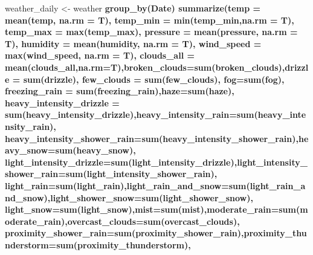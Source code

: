 \documentclass[]{article}
\newenvironment{Shaded}{\begin{snugshade}}{\end{snugshade}}
\newcommand{\KeywordTok}[1]{\textcolor[rgb]{0.13,0.29,0.53}{\textbf{#1}}}
\newcommand{\DataTypeTok}[1]{\textcolor[rgb]{0.13,0.29,0.53}{#1}}
\newcommand{\StringTok}[1]{\textcolor[rgb]{0.31,0.60,0.02}{#1}}
\newcommand{\OperatorTok}[1]{\textcolor[rgb]{0.81,0.36,0.00}{\textbf{#1}}}
\newcommand{\NormalTok}[1]{#1}
\begin{document}
\begin{Shaded}
\begin{Highlighting}[]
\NormalTok{weather_daily <-}\StringTok{ }\NormalTok{weather }\OperatorTok{%>%}\StringTok{ }
\StringTok{  }\KeywordTok{group_by}\NormalTok{(Date) }\OperatorTok{%>%}\StringTok{ }
\StringTok{  }\KeywordTok{summarize}\NormalTok{(}\DataTypeTok{temp =} \KeywordTok{mean}\NormalTok{(temp, }\DataTypeTok{na.rm =}\NormalTok{ T), }\DataTypeTok{temp_min =} \KeywordTok{min}\NormalTok{(temp_min,}\DataTypeTok{na.rm =}\NormalTok{ T), }\DataTypeTok{temp_max =} \KeywordTok{max}\NormalTok{(temp_max),}
            \DataTypeTok{pressure =} \KeywordTok{mean}\NormalTok{(pressure, }\DataTypeTok{na.rm =}\NormalTok{ T), }\DataTypeTok{humidity =} \KeywordTok{mean}\NormalTok{(humidity, }\DataTypeTok{na.rm =}\NormalTok{ T), }\DataTypeTok{wind_speed =} \KeywordTok{max}\NormalTok{(wind_speed, }\DataTypeTok{na.rm  =}\NormalTok{ T),}
            \DataTypeTok{clouds_all =} \KeywordTok{mean}\NormalTok{(clouds_all,}\DataTypeTok{na.rm=}\NormalTok{T),}\DataTypeTok{broken_clouds=}\KeywordTok{sum}\NormalTok{(broken_clouds),}\DataTypeTok{drizzle =} \KeywordTok{sum}\NormalTok{(drizzle),}
            \DataTypeTok{few_clouds =} \KeywordTok{sum}\NormalTok{(few_clouds), }\DataTypeTok{fog=}\KeywordTok{sum}\NormalTok{(fog), }\DataTypeTok{freezing_rain =} \KeywordTok{sum}\NormalTok{(freezing_rain),}\DataTypeTok{haze=}\KeywordTok{sum}\NormalTok{(haze),}
            \DataTypeTok{heavy_intensity_drizzle =} \KeywordTok{sum}\NormalTok{(heavy_intensity_drizzle),}\DataTypeTok{heavy_intensity_rain=}\KeywordTok{sum}\NormalTok{(heavy_intensity_rain),}
            \DataTypeTok{heavy_intensity_shower_rain=}\KeywordTok{sum}\NormalTok{(heavy_intensity_shower_rain),}\DataTypeTok{heavy_snow=}\KeywordTok{sum}\NormalTok{(heavy_snow),}
            \DataTypeTok{light_intensity_drizzle=}\KeywordTok{sum}\NormalTok{(light_intensity_drizzle),}\DataTypeTok{light_intensity_shower_rain=}\KeywordTok{sum}\NormalTok{(light_intensity_shower_rain),}
            \DataTypeTok{light_rain=}\KeywordTok{sum}\NormalTok{(light_rain),}\DataTypeTok{light_rain_and_snow=}\KeywordTok{sum}\NormalTok{(light_rain_and_snow),}\DataTypeTok{light_shower_snow=}\KeywordTok{sum}\NormalTok{(light_shower_snow),}
            \DataTypeTok{light_snow=}\KeywordTok{sum}\NormalTok{(light_snow),}\DataTypeTok{mist=}\KeywordTok{sum}\NormalTok{(mist),}\DataTypeTok{moderate_rain=}\KeywordTok{sum}\NormalTok{(moderate_rain),}\DataTypeTok{overcast_clouds=}\KeywordTok{sum}\NormalTok{(overcast_clouds),}
            \DataTypeTok{proximity_shower_rain=}\KeywordTok{sum}\NormalTok{(proximity_shower_rain),}\DataTypeTok{proximity_thunderstorm=}\KeywordTok{sum}\NormalTok{(proximity_thunderstorm),}
}}
\end{Highlighting}
\end{Shaded}
\end{document}
